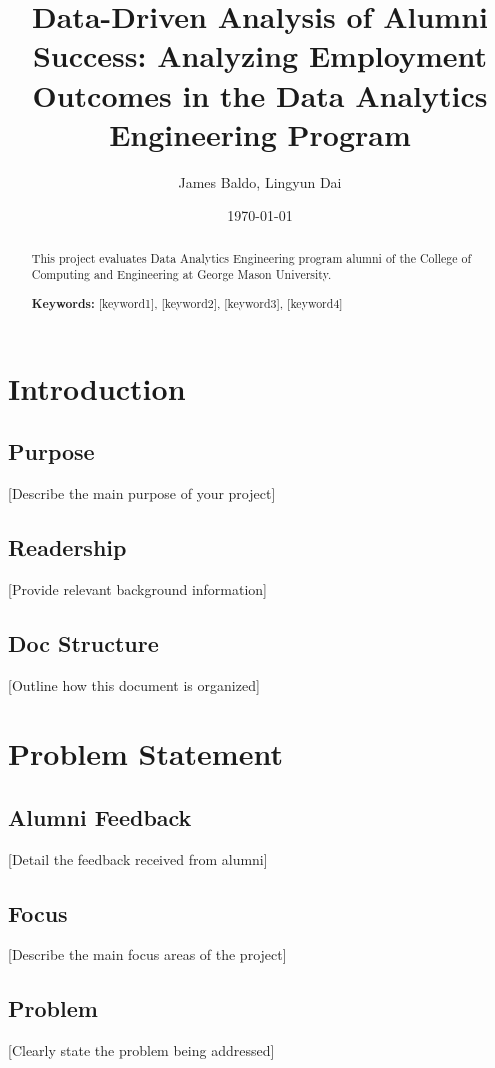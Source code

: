 \documentclass[12pt,a4paper]{article}
\title{\textbf{Data-Driven Analysis of Alumni Success: Analyzing Employment Outcomes in the Data Analytics Engineering Program}}
\author{James Baldo, Lingyun Dai}
\date{\today}
\begin{document}
\maketitle

\begin{abstract}
This project evaluates Data Analytics Engineering program alumni of the College of 
Computing and Engineering at George Mason University. 

\textbf{Keywords:} [keyword1], [keyword2], [keyword3], [keyword4]
\end{abstract}

\newpage
\tableofcontents
\newpage

\section{Introduction}
\subsection{Purpose}
[Describe the main purpose of your project]

\subsection{Readership}
[Provide relevant background information]

\subsection{Doc Structure}
[Outline how this document is organized]

\section{Problem Statement}
\subsection{Alumni Feedback}
[Detail the feedback received from alumni]

\subsection{Focus}
[Describe the main focus areas of the project]

\subsection{Problem}
[Clearly state the problem being addressed]
\end{document}
